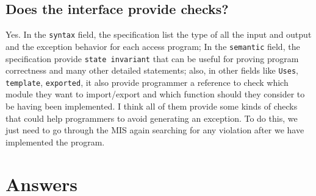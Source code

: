\documentclass[12pt]{article}
\begin{document}
\subsection{Does the interface provide checks?}
Yes. In the \verb|syntax| field, the specification list the type of all the input and output and the exception behavior for each access program; In the \verb|semantic| field, the specification provide \verb|state invariant| that can be useful for proving program correctness and many other detailed statements; also, in other fields like \verb|Uses|, \verb|template|, \verb|exported|, it also provide programmer a reference to check which module they want to import/export and which function should they consider to be having been implemented. I think all of them provide some kinds of checks that could help programmers to avoid generating an exception. To do this, we just need to go through the MIS again searching for any violation after we have implemented the program.

\section{Answers}
\end{document}

